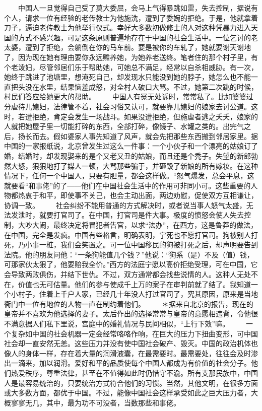 \documentclass[12pt,oneside]{book}
\begin{document}
\begin{common-format}
　　中国人一旦觉得自己受了莫大委屈，会马上气得暴跳如雷，失去控制，据说有个人，请求一位有经验的老传教士为他施洗，遭到了委婉的拒绝。于是，他就拿着刀子，逼迫老传教士为他举行仪式。幸好大多数初做修士的人对这种凭暴力进入天国的方式不感兴趣，可是这条原则普遍地存在于中国的社会生活中。一位乞讨的老太婆，遭到了拒绝，会躺倒在你的马车前。要是被你的车轧了，她就要谢天谢地了，因为现在她有理由要你永远赡养她，为她养老送终。笔者住的那个村子里，有个老泼妇，尽管邻居们乐于帮助她，可她总不满足，经常以自杀相威胁。有一次，她终于跳进了池塘里，想淹死自己，却发现水只能没到她的脖子，她怎么也不能一直把头没在水里，结果恼羞成怒，对全村人破口大骂。不过，她第二次跳的时候，村民们答应给她更大的帮助。 
　　中国人有冤无处诉时，常常私了。比如婆婆过分虐待儿媳妇，法律管不着，社会习俗又认可，就要靠儿媳妇的娘家去讨公道。这时，若遭拒绝，肯定会发生一场战斗。如果没遭拒绝，但施虐者逃之夭夭，娘家的人就把她屋子里一切能打碎的东西，全部打碎，像镜子、水罐之类的。出完气之后，扬长而去。假如婆家人事先知道了风声，就会先把那些东西搬到邻居家里。据中国的一家报纸说，北京曾发生过这么一件事：一个小伙子和一个漂亮的姑娘订了婚，结婚时，却发现娶来的是个又老又丑的姑娘，而且还是个秃子。失望的新郎勃然大怒，狠狠地打了媒人一顿，大骂那些骗于，并砸毁了新娘的所有嫁妆。在这种情况下，任何一个中国人，只要有胆量，都会这样做。“怒气爆发，总会平息，这就要看“和事佬”的了——他们在中国社会生活中的作用可非同小可。这些重要的人物都热衷于和平，即使事不关己，也会主动出面，两边劝慰，促使双方互相谦让，协调一致。 
　　社会纠纷不能用普通的方式解决时，或者说当事人怒气太盛，无法发泄时，就要打官司了。在中国，打官司是件大事。极度的愤怒会使人失去控制，大吵大闹，最终决定将冒犯者告官，以求“法办”，在西方，这是鲁莽的做法，在中国，完全是发疯。中国有些格言，明确表明，宁死也不愿打官司。狗被别人打死，乃小事一桩，我们会笑置之。可一位中国移民的狗被打死之后，却声明要告到法院。他的朋友问他：“一条狗能值几个钱？”他说：“狗系（是）不及（值）钱，可那家伙太狠了，他要赔我全价。”西方的法庭宁愿以高价拒绝受理，可在中国，它会导致两败俱伤，并结下世仇。不过，双方通常都会找些说情的人。这种人无处不在，价值也无可估量。他们的参与使成千上万的案子在审判前就了结了。我知道一个小村子，住着上千户人家，已经几十年没人打过官司了，究其原因，原来是当地衙门中一位有地位的人物一直在制约着他们。 
　　＊据来自北京的报告，现在的皇帝并不喜欢为他选择的妻子。太后作出的选择常常与皇帝的意愿相违背，令他很不满意据人们私下里说，宫庭中的婚礼情况与民间相似，“上行下效”嘛。 
　　一个复杂如中国的社会机器一定会经常咯咯作响，在巨大的压力下扭曲变形，可中国社会却一直安然无恙。这些压力并没有使中国社会破产、毁灭。中国的政治机体也像人的身体一样，存在着大量的润滑液囊，在最需要时。最需要处，往往会及时渗出一滴来，加以润滑。爱好和平的品质使每个中国人都成为有价值的社会分子。他们热爱秩序，尊重法律，甚至在不值得如此时仍惜守不渝。所有支那民族中，中国人是最容易统治的，只要统治方式符合他们的习惯。当然，其他文明，在很多方面或大多数方面，都优于中国。不过，能像中国社会这样承受如此之巨大压力者，大概寥寥无几，其中，最为功不可没者，当数那些和事佬。



\end{common-format}
\end{document}
